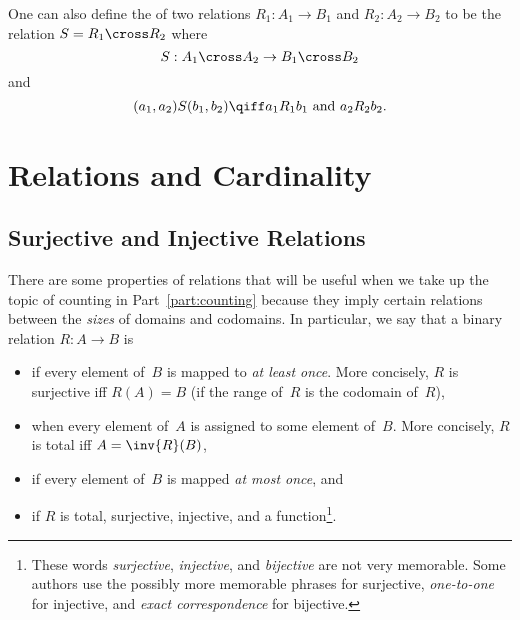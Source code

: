 One can also define the  of two relations $R_1 : A_1 \to
B_1$ and $R_2 : A_2 \to B_2$ to be the relation $S = R_1 \cross R_2$
where
\begin{equation*}
    S : A_1 \cross A_2 \to B_1 \cross B_2
\end{equation*}
and
\begin{equation*}
    (a_1, a_2) S (b_1, b_2) \qiff a_1 R_1 b_1 \text{ and } a_2 R_2 b_2.
\end{equation*}

\section{Relations and Cardinality}\label{sec:relations_cardinality}

\subsection{Surjective and Injective
  Relations}\label{sec:surj-inj-rels}

There are some properties of relations that will be useful when we
take up the topic of counting in Part~\ref{part:counting} because they
imply certain relations between the \emph{sizes} of domains and
codomains.  In particular, we say that a binary relation $R: A \to B$
is
\begin{itemize}

\item
{} if every element of~$B$ is mapped to \emph{at least
  once}.  More concisely, $R$ is surjective
iff $R(A) = B$ (\ie if the range of~$R$ is the codomain of~$R$),

\item
{} when every element of~$A$ is assigned to some element
of~$B$.  More concisely, $R$ is total iff $A = \inv{R}(B)$,

\item
{} if every element of~$B$ is mapped \emph{at most
  once}, and

\item
{} if $R$ is total, surjective, injective, and a
function\footnote{These words \emph{surjective}, \emph{injective}, and
  \emph{bijective} are not very memorable.  Some authors use the
  possibly more memorable phrases  for surjective,
  \emph{one-to-one} for injective, and \emph{exact correspondence} for
  bijective.}.

\end{itemize}

